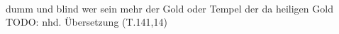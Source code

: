 \begin{exe}
\ex \label{ex:T28617} \gll {}                 \\
{dumm} {und} {blind} {} {wer} {sein} {mehr} {} {der} {Gold} {oder} {Tempel} {der} {da} {heiligen} {Gold} {}\\
\glt TODO: nhd. Übersetzung (T.141,14)
\end{exe}
